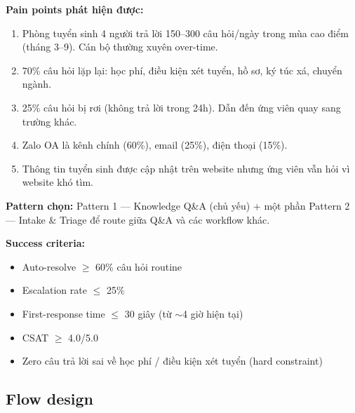 \documentclass[11pt,a4paper]{article}
\begin{document}
\textbf{Pain points phát hiện được:}
\begin{enumerate}
\item Phòng tuyển sinh 4 người trả lời 150--300 câu hỏi/ngày trong mùa cao điểm (tháng 3--9). Cán bộ thường xuyên over-time.
\item 70\% câu hỏi lặp lại: học phí, điều kiện xét tuyển, hồ sơ, ký túc xá, chuyển ngành.
\item 25\% câu hỏi bị rơi (không trả lời trong 24h). Dẫn đến ứng viên quay sang trường khác.
\item Zalo OA là kênh chính (60\%), email (25\%), điện thoại (15\%).
\item Thông tin tuyển sinh được cập nhật trên website nhưng ứng viên vẫn hỏi vì website khó tìm.
\end{enumerate}

\textbf{Pattern chọn:} Pattern 1 — Knowledge Q\&A (chủ yếu) + một phần Pattern 2 — Intake \& Triage để route giữa Q\&A và các workflow khác.

\textbf{Success criteria:}
\begin{itemize}
\item Auto-resolve $\geq$ 60\% câu hỏi routine
\item Escalation rate $\leq$ 25\%
\item First-response time $\leq$ 30 giây (từ $\sim$4 giờ hiện tại)
\item CSAT $\geq$ 4.0/5.0
\item Zero câu trả lời sai về học phí / điều kiện xét tuyển (hard constraint)
\end{itemize}

\subsection{Flow design}
\end{document}
